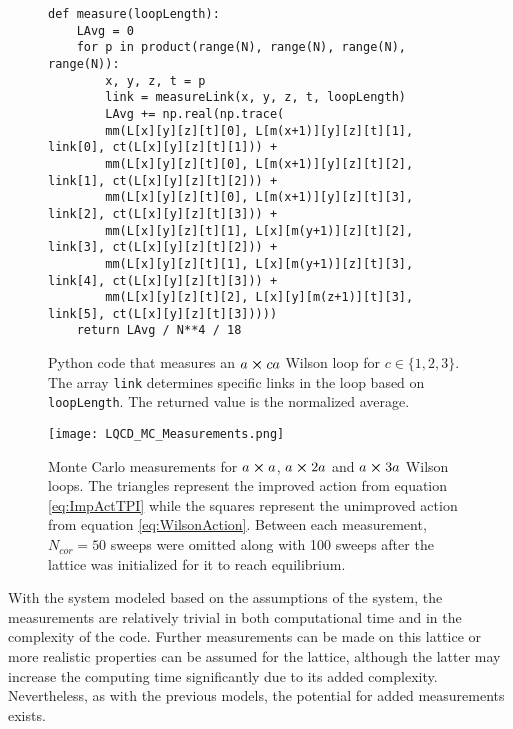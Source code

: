 \documentclass[11pt]{article}
\begin{document}
\begin{figure}[h!]
\begin{lstlisting}
def measure(loopLength):
    LAvg = 0
    for p in product(range(N), range(N), range(N), range(N)):
        x, y, z, t = p
        link = measureLink(x, y, z, t, loopLength)
        LAvg += np.real(np.trace( 
        mm(L[x][y][z][t][0], L[m(x+1)][y][z][t][1], link[0], ct(L[x][y][z][t][1])) + 
        mm(L[x][y][z][t][0], L[m(x+1)][y][z][t][2], link[1], ct(L[x][y][z][t][2])) + 
        mm(L[x][y][z][t][0], L[m(x+1)][y][z][t][3], link[2], ct(L[x][y][z][t][3])) + 
        mm(L[x][y][z][t][1], L[x][m(y+1)][z][t][2], link[3], ct(L[x][y][z][t][2])) + 
        mm(L[x][y][z][t][1], L[x][m(y+1)][z][t][3], link[4], ct(L[x][y][z][t][3])) + 
        mm(L[x][y][z][t][2], L[x][y][m(z+1)][t][3], link[5], ct(L[x][y][z][t][3]))))
    return LAvg / N**4 / 18
\end{lstlisting}
	\caption{Python code that measures an $a\cross ca$ Wilson loop for $c\in\{1,2,3\}$. The array \texttt{link} determines specific links in the loop based on \texttt{loopLength}. The returned value is the normalized average.}
	\label{fig:LQCDMCCode}
\end{figure}

\begin{figure}[h]
	\centering
	\texttt{[image: LQCD\_MC\_Measurements.png]}
	\caption{Monte Carlo measurements for $a\cross a$, $a\cross2a$ and $a\cross3a$ Wilson loops. The triangles represent the improved action from equation \ref{eq:ImpActTPI} while the squares represent the unimproved action from equation \ref{eq:WilsonAction}. Between each measurement, $N_{cor}=50$ sweeps were omitted along with 100 sweeps after the lattice was initialized for it to reach equilibrium.}
	\label{fig:LQCDPlot}
\end{figure}

With the system modeled based on the assumptions of the system, the measurements are relatively trivial in both computational time and in the complexity of the code. Further measurements can be made on this lattice or more realistic properties can be assumed for the lattice, although the latter may increase the computing time significantly due to its added complexity. Nevertheless, as with the previous models, the potential for added measurements exists.
\end{document}
